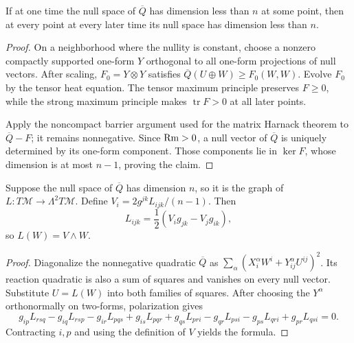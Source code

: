 \begin{lemma}
\label{lem:chow-ii-ancient-harnack-nullspace-propagation}
If at one time the null space of \(\overline Q\) has dimension less than
\(n\) at some point, then at every point at every later time its null space
has dimension less than \(n\).
\end{lemma}
\begin{proof}
On a neighborhood where the nullity is constant, choose a nonzero compactly
supported one-form \(Y\) orthogonal to all one-form projections of null
vectors.  After scaling, \(F_0=Y\otimes Y\) satisfies
\(\overline Q(U\oplus W)\ge F_0(W,W)\).  Evolve \(F_0\) by the tensor heat
equation.  The tensor maximum principle preserves \(F\ge0\), while the strong
maximum principle makes \(\operatorname{tr}F>0\) at all later points.

Apply the noncompact barrier argument used for the matrix Harnack theorem to
\(\overline Q-F\); it remains nonnegative.  Since \(\operatorname{Rm}>0\), a null vector
of \(\overline Q\) is uniquely determined by its one-form component.  Those
components lie in \(\ker F\), whose dimension is at most \(n-1\), proving the
claim.
\end{proof}

\begin{lemma}
\label{lem:chow-ii-nullspace-map-is-wedge-map}
Suppose the null space of \(\overline Q\) has dimension \(n\), so it is the
graph of \(L:T\mathcal M\to\Lambda^2T\mathcal M\).  Define
\(V_i=2g^{jk}L_{ijk}/(n-1)\).  Then
\[
L_{ijk}=\frac12(V_ig_{jk}-V_jg_{ik}),
\]
so \(L(W)=V\wedge W\).
\end{lemma}
\begin{proof}
Diagonalize the nonnegative quadratic \(\overline Q\) as
\(\sum_\alpha(X_i^\alpha W^i+Y_{ij}^\alpha U^{ij})^2\).  Its reaction
quadratic is also a sum of squares and vanishes on every null vector.
Substitute \(U=L(W)\) into both families of squares.  After choosing the
\(Y^\alpha\) orthonormally on two-forms, polarization gives
\[
g_{ip}L_{rsq}-g_{iq}L_{rsp}-g_{ir}L_{pqs}+g_{is}L_{pqr}
+g_{qs}L_{pri}-g_{qr}L_{psi}-g_{ps}L_{qri}+g_{pr}L_{qsi}=0.
\]
Contracting \(i,p\) and using the definition of \(V\) yields the formula.
\end{proof}

